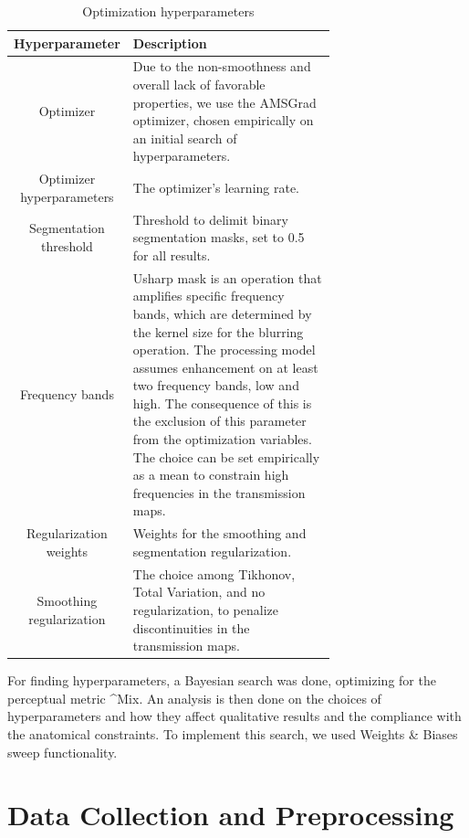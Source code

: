\documentclass[nomenclature, english, bibtex]{kththesis}
\numberwithin{listing}{chapter}
\begin{document}
\begin{table}[H]
    \centering
    \begin{tabular}{ | c | p{0.7\linewidth}| }
        \hline
        \textbf{Hyperparameter} & \textbf{Description} \\
        \hline
        Optimizer & Due to the non-smoothness and overall lack of favorable properties, we
       use the AMSGrad \cite{reddiConvergenceAdam2019} optimizer, chosen empirically on an initial search of hyperparameters. \\
        \hline
        Optimizer hyperparameters & The optimizer's learning rate. \\
        \hline
        Segmentation threshold & Threshold to delimit binary segmentation masks, set to 0.5 for all results. \\
        \hline
        Frequency bands & Usharp mask is an operation that amplifies specific frequency bands, which are determined
        by the kernel size for the blurring operation. The processing model assumes enhancement on at least two
        frequency bands, low and high. The consequence of this is the exclusion of this parameter from the optimization
        variables. The choice can be set empirically as a mean to constrain high frequencies in the transmission maps.  \\
        \hline
        Regularization weights & Weights for the smoothing and segmentation regularization. \\
        \hline
        Smoothing regularization & The choice among Tikhonov, Total Variation, and no regularization,
        to penalize discontinuities in the transmission maps. \\
        \hline
    \end{tabular}
    \caption{Optimization hyperparameters}
    \label{tab:hyperparametersList}
\end{table}

For finding hyperparameters, a Bayesian search was done, optimizing for the perceptual metric ^{Mix}.
An analysis is then done on the choices of hyperparameters and how they affect qualitative results and
the compliance with the anatomical constraints. To implement this search, we used Weights \& Biases \cite{wandb} sweep
functionality.

\section{Data Collection and Preprocessing}
\label{sec:dataCollection}
\end{document}
